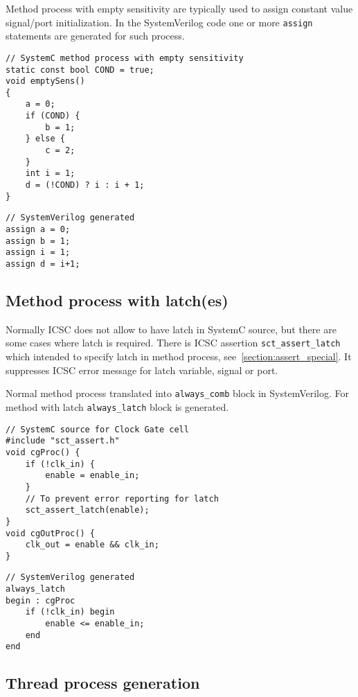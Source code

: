 Method process with empty sensitivity are typically used to assign constant value signal/port initialization. In the SystemVerilog code one or more {\tt assign} statements are generated for such process. 

\begin{lstlisting}[style=mycpp]
// SystemC method process with empty sensitivity
static const bool COND = true;
void emptySens()
{
    a = 0;
    if (COND) {
        b = 1;
    } else {
        c = 2;
    }
    int i = 1;
    d = (!COND) ? i : i + 1; 
}
\end{lstlisting}
%
\begin{lstlisting}[style=myverilog]
// SystemVerilog generated
assign a = 0;
assign b = 1;
assign i = 1;
assign d = i+1;
\end{lstlisting}


\subsection{Method process with latch(es)}\label{section:method_latches}

Normally ICSC does not allow to have latch in SystemC source, but there are some cases where latch is required. There is ICSC assertion {\tt sct\_assert\_latch} which intended to specify latch in method process, see~\ref{section:assert_special}. It suppresses ICSC error message for latch variable, signal or port. 

Normal method process translated into {\tt always\_comb} block in SystemVerilog. For method with latch {\tt always\_latch} block is generated.

\begin{lstlisting}[style=mycpp]
// SystemC source for Clock Gate cell
#include "sct_assert.h"
void cgProc() {
    if (!clk_in) {
        enable = enable_in;
    }
    // To prevent error reporting for latch
    sct_assert_latch(enable);
}
void cgOutProc() {
    clk_out = enable && clk_in;
}
\end{lstlisting}
%
\begin{lstlisting}[style=myverilog]
// SystemVerilog generated 
always_latch
begin : cgProc
    if (!clk_in) begin
        enable <= enable_in;
    end
end
\end{lstlisting}

\subsection{Thread process generation}\label{section:thread_gen}

